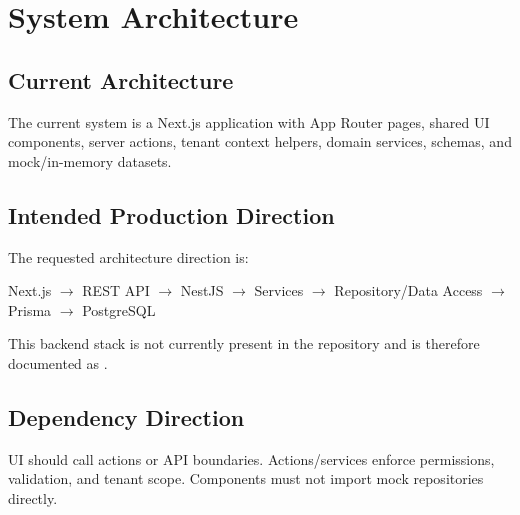 \chapter{System Architecture}
\section{Current Architecture}
The current system is a Next.js application with App Router pages, shared UI components, server actions, tenant context helpers, domain services, schemas, and mock/in-memory datasets.



\section{Intended Production Direction}
The requested architecture direction is:
\begin{center}
Next.js $\rightarrow$ REST API $\rightarrow$ NestJS $\rightarrow$ Services $\rightarrow$ Repository/Data Access $\rightarrow$ Prisma $\rightarrow$ PostgreSQL
\end{center}
This backend stack is not currently present in the repository and is therefore documented as \statusplanned.

\section{Dependency Direction}
UI should call actions or API boundaries. Actions/services enforce permissions, validation, and tenant scope. Components must not import mock repositories directly.


